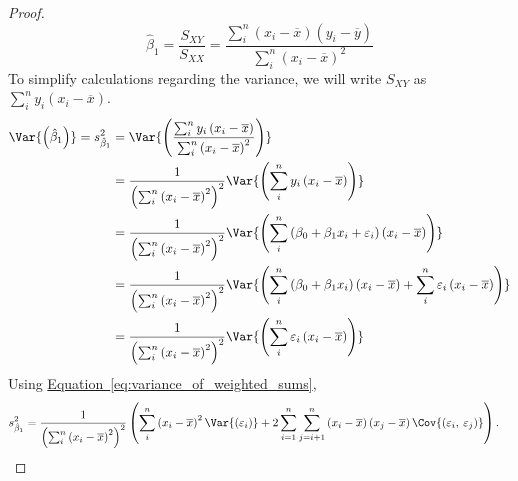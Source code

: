 \documentclass{article}
\begin{document}
\begin{proof}
\begin{equation*}
        \hat{\beta}_1 = \frac{S_{XY}}{S_{XX}} = \frac{\sum_i^n \left( x_i - \overline{x} \right) \left( y_i - \overline{y} \right)}{\sum_i^n \left( x_i - \overline{x} \right)^2}
    \end{equation*}
    To simplify calculations regarding the variance, we will write \(S_{XY}\) as \(\sum_i^n y_i \left( x_i - \overline{x} \right)\).
    \begin{align*}
        \Var{\left( \hat{\beta}_1 \right)} = s_{\hat{\beta}_1}^2 & = \Var{\left( \frac{\sum_i^n y_i \left( x_i - \overline{x} \right)}{\sum_i^n \left( x_i - \overline{x} \right)^2} \right)}                                                                                                               \\
                                                                 & = \frac{1}{\left( \sum_i^n \left( x_i - \overline{x} \right)^2 \right)^2} \Var{\left( \sum_i^n y_i \left( x_i - \overline{x} \right) \right)}                                                                                            \\
                                                                 & = \frac{1}{\left( \sum_i^n \left( x_i - \overline{x} \right)^2 \right)^2} \Var{\left( \sum_i^n \left( \beta_0 + \beta_1x_i + \varepsilon_i \right) \left( x_i - \overline{x} \right) \right)}                                            \\
                                                                 & = \frac{1}{\left( \sum_i^n \left( x_i - \overline{x} \right)^2 \right)^2} \Var{\left( \sum_i^n \left( \beta_0 + \beta_1x_i \right) \left( x_i - \overline{x} \right) + \sum_i^n \varepsilon_i \left( x_i - \overline{x} \right) \right)} \\
                                                                 & = \frac{1}{\left( \sum_i^n \left( x_i - \overline{x} \right)^2 \right)^2} \Var{\left( \sum_i^n \varepsilon_i \left( x_i - \overline{x} \right) \right)}
    \end{align*}
    Using \hyperref[eq:variance_of_weighted_sums]{Equation~\ref{eq:variance_of_weighted_sums}},
    \begin{align*}
        s_{\hat{\beta}_1}^2 & = \frac{1}{\left( \sum_i^n \left( x_i - \overline{x} \right)^2 \right)^2} \left( \sum_i^n \left( x_i - \overline{x} \right)^2 \Var{\left( \varepsilon_i \right)} + 2\sum_{i=1}^n\sum_{j=i+1}^n\left( x_i - \overline{x} \right)\left( x_j - \overline{x} \right)\Cov{\left(\varepsilon_i,\: \varepsilon_j\right)} \right).
    \end{align*}

\end{proof}
\end{document}
